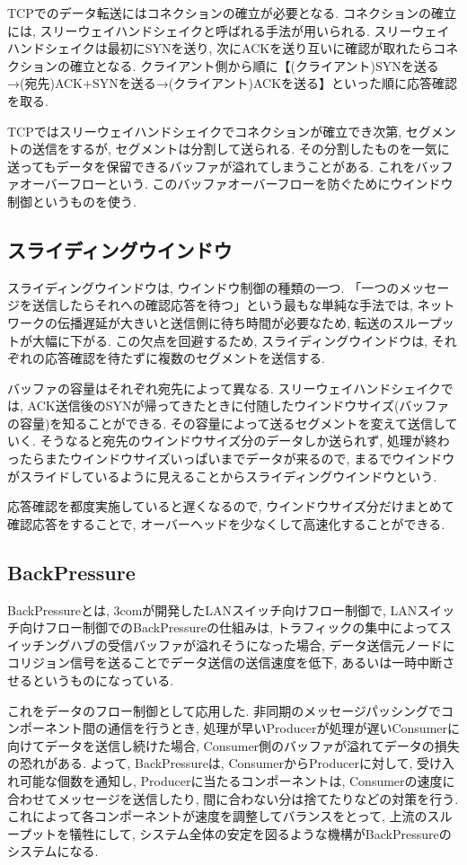 \documentclass[11pt]{jreport}
\begin{document}
TCPでのデータ転送にはコネクションの確立が必要となる. コネクションの確立には, スリーウェイハンドシェイクと呼ばれる手法が用いられる. 
スリーウェイハンドシェイクは最初にSYNを送り, 次にACKを送り互いに確認が取れたらコネクションの確立となる. 
クライアント側から順に【(クライアント)SYNを送る→(宛先)ACK+SYNを送る→(クライアント)ACKを送る】といった順に応答確認を取る.

TCPではスリーウェイハンドシェイクでコネクションが確立でき次第, セグメントの送信をするが, セグメントは分割して送られる. \cite{qiita_flow}
その分割したものを一気に送ってもデータを保留できるバッファが溢れてしまうことがある. これをバッファオーバーフローという. このバッファオーバーフローを防ぐためにウインドウ制御というものを使う.

\subsection{スライディングウインドウ}
スライディングウインドウは, ウインドウ制御の種類の一つ. 
「一つのメッセージを送信したらそれへの確認応答を待つ」という最もな単純な手法では, ネットワークの伝播遅延が大きいと送信側に待ち時間が必要なため, 転送のスループットが大幅に下がる. 
この欠点を回避するため, スライディングウインドウは, それぞれの応答確認を待たずに複数のセグメントを送信する. 

バッファの容量はそれぞれ宛先によって異なる. スリーウェイハンドシェイクでは, ACK送信後のSYNが帰ってきたときに付随したウインドウサイズ(バッファの容量)を知ることができる. 
その容量によって送るセグメントを変えて送信していく. \cite{qiita_flow}
そうなると宛先のウインドウサイズ分のデータしか送られず, 処理が終わったらまたウインドウサイズいっぱいまでデータが来るので, まるでウインドウがスライドしているように見えることからスライディングウインドウという.

応答確認を都度実施していると遅くなるので, ウインドウサイズ分だけまとめて確認応答をすることで, 
オーバーヘッドを少なくして高速化することができる.

\subsection{BackPressure}
BackPressureとは, 3comが開発したLANスイッチ向けフロー制御で, LANスイッチ向けフロー制御でのBackPressureの仕組みは, トラフィックの集中によってスイッチングハブの受信バッファが溢れそうになった場合, データ送信元ノードにコリジョン信号を送ることでデータ送信の送信速度を低下, あるいは一時中断させるというものになっている.\cite{weblio_backpressure}

これをデータのフロー制御として応用した. 非同期のメッセージパッシングでコンポーネント間の通信を行うとき, 処理が早いProducerが処理が遅いConsumerに向けてデータを送信し続けた場合, Consumer側のバッファが溢れてデータの損失の恐れがある. 
よって, BackPressureは, ConsumerからProducerに対して, 受け入れ可能な個数を通知し, Producerに当たるコンポーネントは, Consumerの速度に合わせてメッセージを送信したり, 間に合わない分は捨てたりなどの対策を行う. \cite{slide_backpressure}
これによって各コンポーネントが速度を調整してバランスをとって, 上流のスループットを犠牲にして, システム全体の安定を図るような機構がBackPressureのシステムになる.
\end{document}
